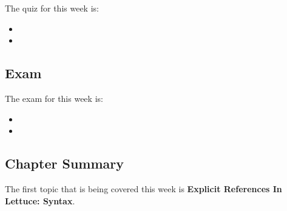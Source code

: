 The quiz for this week is:

\begin{itemize}
    \item {}
    \item {}
\end{itemize}

\subsection{Exam}

The exam for this week is:

\begin{itemize}
    \item {}
    \item {}
\end{itemize}

\subsection{Chapter Summary}

The first topic that is being covered this week is \textbf{Explicit References In Lettuce: Syntax}.

